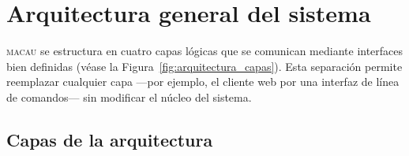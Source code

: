 \section{Arquitectura general del sistema}
\label{sec:arquitectura}

\textsc{macau} se estructura en cuatro capas lógicas que se comunican
mediante interfaces bien definidas (véase la
Figura~\ref{fig:arquitectura_capas}).
Esta separación permite reemplazar cualquier capa —por ejemplo, el cliente
web por una interfaz de línea de comandos— sin modificar el núcleo del
sistema.

\subsection{Capas de la arquitectura}
\label{subsec:capas}


